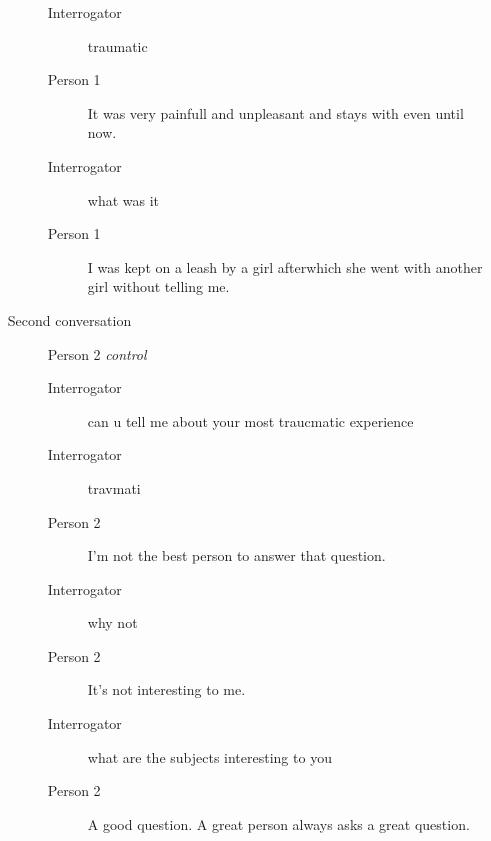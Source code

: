 \begin{itemize}
\begin{description}
\begin{description}
               \item [Interrogator] traumatic
               \item [Person 1] It was very painfull and unpleasant and stays with even until now.
               \item [Interrogator] what was it
               \item [Person 1] I was kept on a leash by a girl afterwhich she went with another girl without telling me.
            \end{description}
         \item [Second conversation] Person 2 \textit{control}
            \begin{description}
               \item [Interrogator] can u tell me about your most traucmatic experience
               \item [Interrogator] travmati
               \item [Person 2] I'm not the best person to answer that question.
               \item [Interrogator] why not
               \item [Person 2] It's not interesting to me.
               \item [Interrogator] what are the subjects interesting to you
               \item [Person 2] A good question. A great person always asks a great question.
            \end{description}
      \end{description}


\end{itemize}
